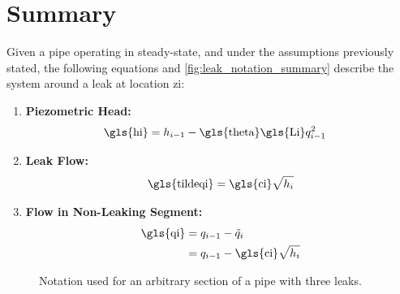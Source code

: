 \newpage
\section{Summary}
Given a pipe operating in steady-state, and under the assumptions previously stated, the following equations and \autoref{fig:leak_notation_summary} describe the system around a leak at location \gls{zi}:
\begin{enumerate}
    \item \textbf{Piezometric Head:}  
    \begin{align}
        \text{\gls{hi}} &= h_{i-1} - \text{\gls{theta}} \text{\gls{Li}} q_{i-1}^2 \label{eq:upstream_head}
    \end{align}

    \item \textbf{Leak Flow:}  
    \begin{equation*}
        \text{\gls{tildeqi}} = \text{\gls{ci}}\sqrt{h_i}
    \end{equation*}

    \item \textbf{Flow in Non-Leaking Segment:}  
    \begin{align}
        \text{\gls{qi}} &= q_{i-1}-\tilde{q}_{i} \notag \\
        &= q_{i-1} - \text{\gls{ci}}\sqrt{h_i} \label{eq:upstream_flow}
    \end{align}
\end{enumerate}

\begin{figure}[h!]
    \centering
    
    \caption{Notation used for an arbitrary section of a pipe with three leaks.}
    \label{fig:leak_notation_summary}
\end{figure}

